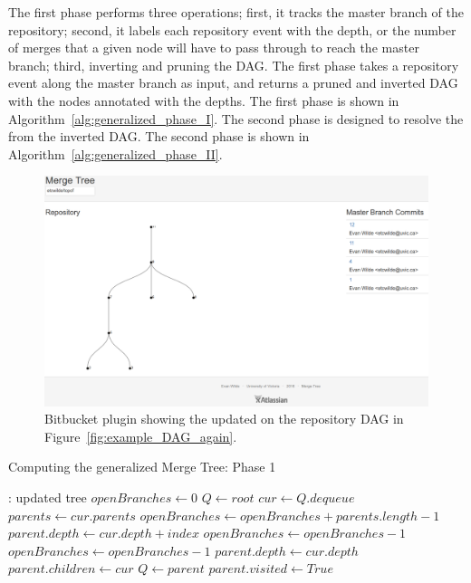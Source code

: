 The first phase performs three operations; first, it tracks the master
branch of the repository; second, it labels each repository event with
the depth, or the number of merges that a given node will have to pass
through to reach the master branch; third, inverting and pruning the
DAG\@. The first phase takes a repository event along the master branch
as input, and returns a pruned and inverted DAG with the nodes annotated
with the depths. The first phase is shown in
Algorithm~\ref{alg:generalized_phase_I}. The second phase is designed to
resolve the \mt{} from the inverted DAG\@. The second phase is shown in
Algorithm~\ref{alg:generalized_phase_II}.

\begin{figure}[htpb]
  \centering
  \includegraphics[width=0.8\linewidth]{Figures/bitbucket_plugin.png}
  \caption{Bitbucket plugin showing the updated \mt{} on the repository
  DAG in Figure~\ref{fig:example_DAG_again}.}
  \label{fig:bitbucket_plugin}
\end{figure}

\begin{algorithm}
  \caption{Computing the generalized Merge Tree: Phase 1}
  \label{alg:generalized_phase_I}
  \begin{algorithmic}[1]
     : updated tree
    \State $openBranches \gets 0$
    \State $Q \gets root$
    \Do
    \State $cur \gets Q.dequeue$
    \State $parents \gets cur.parents$
    \State $openBranches \gets openBranches + parents.length - 1$
    \State $parent.depth \gets cur.depth + index$
    \State $openBranches \gets openBranches - 1$
    \State $openBranches \gets openBranches - 1$
    \State $parent.depth \gets cur.depth$
    \EndIf
    \State $parent.children \gets cur$
    \State $Q \gets parent$
    \State $parent.visited \gets True$
    \EndIf
    \EndFor
    \EndFunction
  \end{algorithmic}
\end{algorithm}

